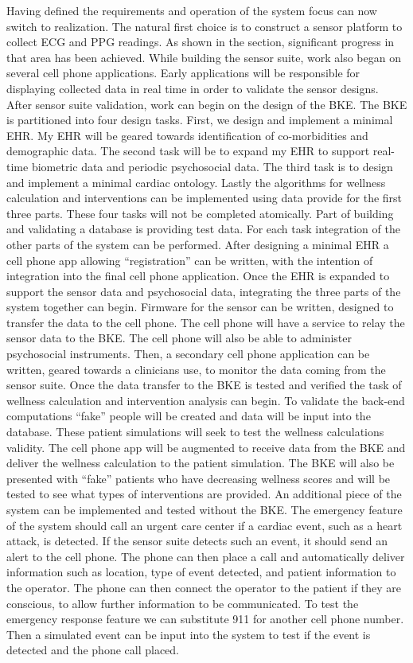 Having defined the requirements and operation of the system focus can now switch to realization. The natural first choice is to construct a sensor platform to collect ECG and PPG readings. As shown in the  section, significant progress in that area has been achieved. While building the sensor suite, work also began on several cell phone applications. Early applications will be responsible for displaying collected data in real time in order to validate the sensor designs. After sensor suite validation, work can begin on the design of the BKE. The BKE is partitioned into four design tasks. First, we design and implement a minimal EHR. My EHR will be geared towards identification of co-morbidities and demographic data. The second task will be to expand my EHR to support real-time biometric data and periodic psychosocial data. The third task is to design and implement a minimal cardiac ontology. Lastly the algorithms for wellness calculation and interventions can be implemented using data provide for the first three parts. These four tasks will not be completed atomically. Part of building and validating a database is providing test data. For each task integration of the other parts of the system can be performed. After designing a minimal EHR a cell phone app allowing “registration” can be written, with the intention of integration into the final cell phone application. Once the EHR is expanded to support the sensor data and psychosocial data, integrating the three parts of the system together can begin. Firmware for the sensor can be written, designed to transfer the data to the cell phone.  The cell phone will have a service to relay the sensor data to the BKE. The cell phone will also be able to administer psychosocial instruments. Then, a secondary cell phone application can be written, geared towards a clinicians use, to monitor the data coming from the sensor suite. Once the data transfer to the BKE is tested and verified the task of wellness calculation and intervention analysis can begin. To validate the back-end computations “fake” people will be created and data will be input into the database. These patient simulations will seek to test the wellness calculations validity. The cell phone app will be augmented to receive data from the BKE and deliver the wellness calculation to the patient simulation. The BKE will also be presented with “fake” patients who have decreasing wellness scores and will be tested to see what types of interventions are provided. An additional piece of the system can be implemented and tested without the BKE. The emergency feature of the system should call an urgent care center if a cardiac event, such as a heart attack, is detected. If the sensor suite detects such an event, it should send an alert to the cell phone. The phone can then place a call and automatically deliver information such as location, type of event detected, and patient information to the operator. The phone can then connect the operator to the patient if they are conscious, to allow further information to be communicated. To test the emergency response feature we can substitute 911 for another cell phone number. Then a simulated event can be input into the system to test if the event is detected and the phone call placed. 


